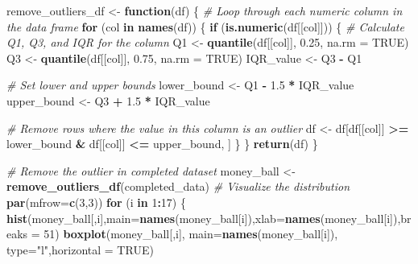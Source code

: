 \documentclass[
]{article}
\newenvironment{Shaded}{\begin{snugshade}}{\end{snugshade}}
\newcommand{\AttributeTok}[1]{\textcolor[rgb]{0.13,0.29,0.53}{#1}}
\newcommand{\CommentTok}[1]{\textcolor[rgb]{0.56,0.35,0.01}{\textit{#1}}}
\newcommand{\ConstantTok}[1]{\textcolor[rgb]{0.56,0.35,0.01}{#1}}
\newcommand{\ControlFlowTok}[1]{\textcolor[rgb]{0.13,0.29,0.53}{\textbf{#1}}}
\newcommand{\DecValTok}[1]{\textcolor[rgb]{0.00,0.00,0.81}{#1}}
\newcommand{\FloatTok}[1]{\textcolor[rgb]{0.00,0.00,0.81}{#1}}
\newcommand{\FunctionTok}[1]{\textcolor[rgb]{0.13,0.29,0.53}{\textbf{#1}}}
\newcommand{\NormalTok}[1]{#1}
\newcommand{\OtherTok}[1]{\textcolor[rgb]{0.56,0.35,0.01}{#1}}
\newcommand{\SpecialCharTok}[1]{\textcolor[rgb]{0.81,0.36,0.00}{\textbf{#1}}}
\newcommand{\StringTok}[1]{\textcolor[rgb]{0.31,0.60,0.02}{#1}}
\begin{document}
\begin{Shaded}
\begin{Highlighting}[]
\NormalTok{remove\_outliers\_df }\OtherTok{\textless{}{-}} \ControlFlowTok{function}\NormalTok{(df) \{}
  \CommentTok{\# Loop through each numeric column in the data frame}
  \ControlFlowTok{for}\NormalTok{ (col }\ControlFlowTok{in} \FunctionTok{names}\NormalTok{(df)) \{}
    \ControlFlowTok{if}\NormalTok{ (}\FunctionTok{is.numeric}\NormalTok{(df[[col]])) \{}
      \CommentTok{\# Calculate Q1, Q3, and IQR for the column}
\NormalTok{      Q1 }\OtherTok{\textless{}{-}} \FunctionTok{quantile}\NormalTok{(df[[col]], }\FloatTok{0.25}\NormalTok{, }\AttributeTok{na.rm =} \ConstantTok{TRUE}\NormalTok{)}
\NormalTok{      Q3 }\OtherTok{\textless{}{-}} \FunctionTok{quantile}\NormalTok{(df[[col]], }\FloatTok{0.75}\NormalTok{, }\AttributeTok{na.rm =} \ConstantTok{TRUE}\NormalTok{)}
\NormalTok{      IQR\_value }\OtherTok{\textless{}{-}}\NormalTok{ Q3 }\SpecialCharTok{{-}}\NormalTok{ Q1}
      
      \CommentTok{\# Set lower and upper bounds}
\NormalTok{      lower\_bound }\OtherTok{\textless{}{-}}\NormalTok{ Q1 }\SpecialCharTok{{-}} \FloatTok{1.5} \SpecialCharTok{*}\NormalTok{ IQR\_value}
\NormalTok{      upper\_bound }\OtherTok{\textless{}{-}}\NormalTok{ Q3 }\SpecialCharTok{+} \FloatTok{1.5} \SpecialCharTok{*}\NormalTok{ IQR\_value}
      
      \CommentTok{\# Remove rows where the value in this column is an outlier}
\NormalTok{      df }\OtherTok{\textless{}{-}}\NormalTok{ df[df[[col]] }\SpecialCharTok{\textgreater{}=}\NormalTok{ lower\_bound }\SpecialCharTok{\&}\NormalTok{ df[[col]] }\SpecialCharTok{\textless{}=}\NormalTok{ upper\_bound, ]}
\NormalTok{    \}}
\NormalTok{  \}}
  \FunctionTok{return}\NormalTok{(df)}
\NormalTok{\}}

\CommentTok{\# Remove the outlier in completed dataset }
\NormalTok{money\_ball }\OtherTok{\textless{}{-}} \FunctionTok{remove\_outliers\_df}\NormalTok{(completed\_data)}
\CommentTok{\# Visualize the distribution }
\FunctionTok{par}\NormalTok{(}\AttributeTok{mfrow=}\FunctionTok{c}\NormalTok{(}\DecValTok{3}\NormalTok{,}\DecValTok{3}\NormalTok{)) }
\ControlFlowTok{for}\NormalTok{ (i }\ControlFlowTok{in} \DecValTok{1}\SpecialCharTok{:}\DecValTok{17}\NormalTok{) \{}
  \FunctionTok{hist}\NormalTok{(money\_ball[,i],}\AttributeTok{main=}\FunctionTok{names}\NormalTok{(money\_ball[i]),}\AttributeTok{xlab=}\FunctionTok{names}\NormalTok{(money\_ball[i]),}\AttributeTok{breaks =} \DecValTok{51}\NormalTok{)}
  \FunctionTok{boxplot}\NormalTok{(money\_ball[,i], }\AttributeTok{main=}\FunctionTok{names}\NormalTok{(money\_ball[i]), }\AttributeTok{type=}\StringTok{"l"}\NormalTok{,}\AttributeTok{horizontal =} \ConstantTok{TRUE}\NormalTok{)}
  

\end{Highlighting}
\end{Shaded}
\end{document}
